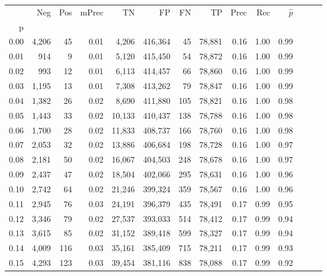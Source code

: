 \begin{tabular}{rrrrrrrrrrrrrr}
\toprule
{} &    Neg &    Pos & mPrec &       TN &       FP &      FN &      TP &  Prec &   Rec & $\hat{p}$ \\
p    &        &        &       &          &          &         &         &       &       &           \\
\midrule
0.00 &  4,206 &     45 &  0.01 &    4,206 &  416,364 &      45 &  78,881 &  0.16 &  1.00 &      0.99 \\
0.01 &    914 &      9 &  0.01 &    5,120 &  415,450 &      54 &  78,872 &  0.16 &  1.00 &      0.99 \\
0.02 &    993 &     12 &  0.01 &    6,113 &  414,457 &      66 &  78,860 &  0.16 &  1.00 &      0.99 \\
0.03 &  1,195 &     13 &  0.01 &    7,308 &  413,262 &      79 &  78,847 &  0.16 &  1.00 &      0.99 \\
0.04 &  1,382 &     26 &  0.02 &    8,690 &  411,880 &     105 &  78,821 &  0.16 &  1.00 &      0.98 \\
0.05 &  1,443 &     33 &  0.02 &   10,133 &  410,437 &     138 &  78,788 &  0.16 &  1.00 &      0.98 \\
0.06 &  1,700 &     28 &  0.02 &   11,833 &  408,737 &     166 &  78,760 &  0.16 &  1.00 &      0.98 \\
0.07 &  2,053 &     32 &  0.02 &   13,886 &  406,684 &     198 &  78,728 &  0.16 &  1.00 &      0.97 \\
0.08 &  2,181 &     50 &  0.02 &   16,067 &  404,503 &     248 &  78,678 &  0.16 &  1.00 &      0.97 \\
0.09 &  2,437 &     47 &  0.02 &   18,504 &  402,066 &     295 &  78,631 &  0.16 &  1.00 &      0.96 \\
0.10 &  2,742 &     64 &  0.02 &   21,246 &  399,324 &     359 &  78,567 &  0.16 &  1.00 &      0.96 \\
0.11 &  2,945 &     76 &  0.03 &   24,191 &  396,379 &     435 &  78,491 &  0.17 &  0.99 &      0.95 \\
0.12 &  3,346 &     79 &  0.02 &   27,537 &  393,033 &     514 &  78,412 &  0.17 &  0.99 &      0.94 \\
0.13 &  3,615 &     85 &  0.02 &   31,152 &  389,418 &     599 &  78,327 &  0.17 &  0.99 &      0.94 \\
0.14 &  4,009 &    116 &  0.03 &   35,161 &  385,409 &     715 &  78,211 &  0.17 &  0.99 &      0.93 \\
0.15 &  4,293 &    123 &  0.03 &   39,454 &  381,116 &     838 &  78,088 &  0.17 &  0.99 &      0.92 \\

\end{tabular}
